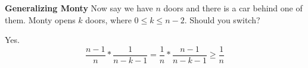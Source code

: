 \question \textbf{Generalizing Monty} \newline
Now say we have $n$ doors and there is a car behind one of them. 
Monty opens $k$ doors, where $0 \leq k \leq n - 2$. Should you switch? 
\begin{solution}
Yes. 
\[\frac{n-1}{n} * \frac{1}{n - k - 1} = \frac{1}{n} * 
\frac{n-1}{n - k - 1} \geq \frac{1}{n}\]
\end{solution}